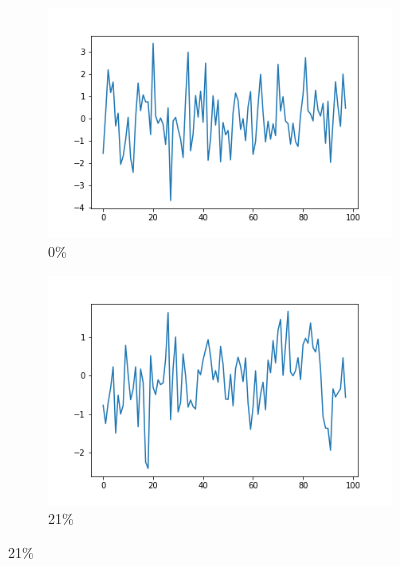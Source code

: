 \begin{figure}
  \centering
  \begin{subfigure}[t]{0.45\textwidth}
  \centering
    \includegraphics[width=\linewidth]{proba_00}
    \caption{
      0\%
    }
    \label{fig:analysis-svc-proba-00}
  \end{subfigure}%
  \begin{subfigure}[t]{0.45\textwidth}
  \centering
    \includegraphics[width=\linewidth]{proba_21}
    \caption{
      21\%
    }
    \label{fig:analysis-svc-proba-21}
  \end{subfigure}


\end{figure}
